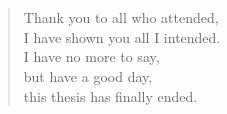 




\section*{}



\vspace*{6cm}

\begin{verse}
    \hspace{3em}Thank you to all who attended, \\
    \vspace{5pt}
    \hspace{3em}I have shown you all I intended. \\
    \vspace{5pt}
    \hspace{3em}I have no more to say,  \\
    \vspace{5pt}
    \hspace{3em}but have a good day,    \\
    \vspace{5pt}
    \hspace{3em}this thesis has finally ended.

\end{verse}













